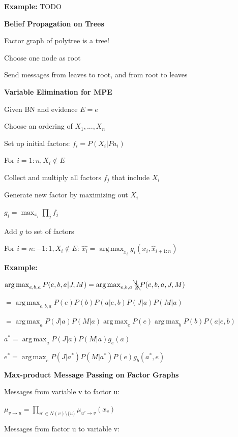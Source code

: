 \documentclass[a4paper, 11pt, landscape]{article}
\DeclareMathOperator*{\argmax}{arg\,max}
\begin{document}
\begin{multicols*}{3}
	\textbf{Example:} TODO

	\textbf{Belief Propagation on Trees}
	\begin{compactitem}
		\item Factor graph of polytree is a tree!
		\item Choose one node as root
		\item Send messages from leaves to root, and from root to leaves
	\end{compactitem}
   
\textbf{Variable Elimination for MPE}	
	\begin{compactitem}
	\item Given BN and evidence $E=e$
	\item Choose an ordering of $X_1, ...,X_n$
	\item Set up initial factors: $f_i = P(X_i | Pa_i)$
	\item For $i=1:n, X_i \notin  E$
  	\begin{compactenum}
  	\item Collect and multiply all factors $f_j$ that include $X_i$   
  	\item Generate new factor by maximizing out $X_i$
  	
	$g_i = \max_{x_i} \prod_{j} f_j$
  	\item Add $g$ to set of factors
  	\end{compactenum}
	\item For $i=n:-1:1, X_i \notin  E$:  $\hat{x_i} = \argmax_{x_i} g_i(x_i, \hat{x}_{i+1:n})$
\end{compactitem}

\textbf{Example: }

$\argmax_{e , b, a} P(e,b,a| J, M) = \argmax_{e , b, a} \bcancel{\frac{1}{Z}} P(e,b,a, J,M)$

$= \argmax_{e , b, a} P(e)P(b)P(a|e,b)P(J|a)P(M|a)$

$= \argmax_{a} P(J|a)P(M|a)  \argmax_{e} P(e)  \argmax_{b} P(b)P(a|e,b)$

$a^{*} = \argmax_{a} P(J|a)P(M|a) g_e(a)$

$e^{*} = \argmax_{e} P(J|a^*)P(M|a^*) P(e) g_b(a^*,e)$


\textbf{Max-product Message Passing on Factor Graphs}

Messages from variable v to factor u: 

$\mu_{v \rightarrow u} = \prod_{u' \in N(v) \setminus \{u\}} \mu_{u' \rightarrow v}(x_{v})$ 

Messages from factor u to variable v:


\end{multicols*}
\end{document}
